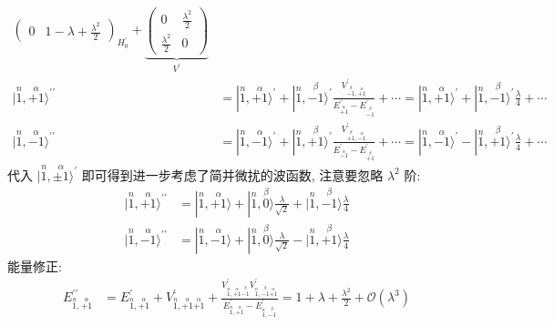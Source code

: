 \documentclass[../../main.tex]{subfiles}
\begin{document}
\begin{enumerate}
\begin{enumerate}
{{\begin{align*}
{\begin{pmatrix}
            0 & 1 - \lambda + \frac{\lambda^{2}}{2}
        \end{pmatrix}}_{H_{0}^{\prime}} + \underbrace{\begin{pmatrix}
            0 & \frac{\lambda^{2}}{2}\\
            \frac{\lambda^{2}}{2} & 0
        \end{pmatrix}}_{V^{\prime}}\\
        |\stackrel{n}{1},\stackrel{\alpha}{+1}\rangle^{\prime\prime} &= |\stackrel{n}{1},\stackrel{\alpha}{+1}\rangle^{\prime} + |\stackrel{n}{1},\stackrel{\beta}{-1}\rangle^{\prime}\frac{V^{\prime}_{\stackrel{\beta}{-1},\stackrel{\alpha}{+1}}}{E^{\prime}_{\stackrel{\alpha}{+1}} - E^{\prime}_{\stackrel{\beta}{-1}}} + \cdots
        = |\stackrel{n}{1},\stackrel{\alpha}{+1}\rangle^{\prime} + |\stackrel{n}{1},\stackrel{\beta}{-1}\rangle^{\prime}\frac{\lambda}{4} + \cdots\\
        |\stackrel{n}{1},\stackrel{\alpha}{-1}\rangle^{\prime\prime} &= |\stackrel{n}{1},\stackrel{\alpha}{-1}\rangle^{\prime} + |\stackrel{n}{1},\stackrel{\beta}{+1}\rangle^{\prime}\frac{V^{\prime}_{\stackrel{\beta}{+1},\stackrel{\alpha}{-1}}}{E^{\prime}_{\stackrel{\alpha}{-1}} - E^{\prime}_{\stackrel{\beta}{+1}}} + \cdots
        = |\stackrel{n}{1},\stackrel{\alpha}{-1}\rangle^{\prime} - |\stackrel{n}{1},\stackrel{\beta}{+1}\rangle^{\prime}\frac{\lambda}{4} + \cdots
    \end{align*}
    代入 $|\stackrel{n}{1},\stackrel{\alpha}{\pm 1}\rangle^{\prime}$ 即可得到进一步考虑了简并微扰的波函数, 注意要忽略 $\lambda^{2}$ 阶:
    \begin{align*}
        |\stackrel{n}{1},\stackrel{\alpha}{+1}\rangle^{\prime\prime} &= \boxed{|\stackrel{n}{1},\stackrel{\alpha}{+1}\rangle + |\stackrel{n}{1},\stackrel{\beta}{0}\rangle\frac{\lambda}{\sqrt{2}} + |\stackrel{n}{1},\stackrel{\beta}{-1}\rangle\frac{\lambda}{4}}\\
        |\stackrel{n}{1},\stackrel{\alpha}{-1}\rangle^{\prime\prime} &= \boxed{|\stackrel{n}{1},\stackrel{\alpha}{-1}\rangle + |\stackrel{n}{1},\stackrel{\beta}{0}\rangle\frac{\lambda}{\sqrt{2}} - |\stackrel{n}{1},\stackrel{\beta}{+1}\rangle\frac{\lambda}{4}}
    \end{align*}
    能量修正:
    \begin{align*}
        E^{\prime\prime}_{\stackrel{n}{1},\stackrel{\alpha}{+1}} &= E^{\prime}_{\stackrel{n}{1},\stackrel{\alpha}{+1}} + V^{\prime}_{\stackrel{n}{1},\stackrel{\alpha}{+1}\stackrel{\alpha}{+1}} + \frac{V^{\prime}_{\stackrel{n}{1},\stackrel{\alpha}{+1}\stackrel{\beta}{-1}}V^{\prime}_{\stackrel{n}{1},\stackrel{\beta}{-1}\stackrel{\alpha}{+1}}}{E^{\prime}_{\stackrel{n}{1},\stackrel{\alpha}{+1}} - E^{\prime}_{\stackrel{n}{1},\stackrel{\beta}{-1}}} = \boxed{1 + \lambda + \frac{\lambda^{2}}{2}} + \mathcal{O}(\lambda^{3})\\

\end{align*}}}
\end{enumerate}
\end{enumerate}
\end{document}
